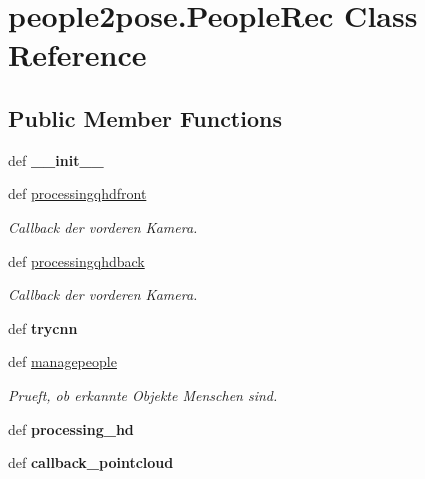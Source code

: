 \hypertarget{classpeople2pose_1_1PeopleRec}{\section{people2pose.\-People\-Rec Class Reference}
\label{classpeople2pose_1_1PeopleRec}
}
\subsection*{Public Member Functions}
\begin{DoxyCompactItemize}
\item 
\hypertarget{classpeople2pose_1_1PeopleRec_ad1219a3141dc4162820c603c1e58bfb7}{def {\bfseries \-\_\-\-\_\-init\-\_\-\-\_\-}}\label{classpeople2pose_1_1PeopleRec_ad1219a3141dc4162820c603c1e58bfb7}

\item 
def \hyperlink{classpeople2pose_1_1PeopleRec_ab902d23b67614051acfd072d73a6a5e6}{processingqhdfront}
\begin{DoxyCompactList}\small\item\em Callback der vorderen Kamera. \end{DoxyCompactList}\item 
def \hyperlink{classpeople2pose_1_1PeopleRec_a18d6ada30e36ef07a8120a64e2b0fc1a}{processingqhdback}
\begin{DoxyCompactList}\small\item\em Callback der vorderen Kamera. \end{DoxyCompactList}\item 
\hypertarget{classpeople2pose_1_1PeopleRec_a3eaf265cf299a98a70afc2c87cce3839}{def {\bfseries trycnn}}\label{classpeople2pose_1_1PeopleRec_a3eaf265cf299a98a70afc2c87cce3839}

\item 
def \hyperlink{classpeople2pose_1_1PeopleRec_a1ec343f6595ac5ba6204e94cf0d3c328}{managepeople}
\begin{DoxyCompactList}\small\item\em Prueft, ob erkannte Objekte Menschen sind. \end{DoxyCompactList}\item 
\hypertarget{classpeople2pose_1_1PeopleRec_a3ded5b9a9b302bb29e5882944b447fc0}{def {\bfseries processing\-\_\-hd}}\label{classpeople2pose_1_1PeopleRec_a3ded5b9a9b302bb29e5882944b447fc0}

\item 
\hypertarget{classpeople2pose_1_1PeopleRec_af7aa82a401458fa5e6da47538247e8e4}{def {\bfseries callback\-\_\-pointcloud}}\label{classpeople2pose_1_1PeopleRec_af7aa82a401458fa5e6da47538247e8e4}


\end{DoxyCompactItemize}
